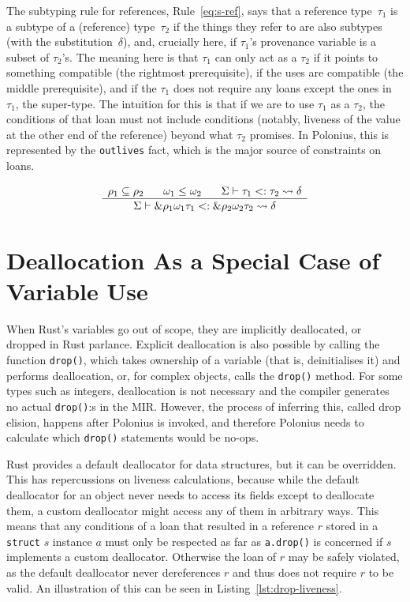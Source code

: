 \documentclass[11pt,a4paper,twoside,openany,draft]{report}
\newcommand{\InRust}[1]{\texttt{#1}}
\newcommand{\InDatalog}[1]{\texttt{#1}}
\newcommand{\ntyperule}[2]{\begin{array}{c}#1\\\hline\raisebox{1pt}{\strut}#2\end{array}}
\begin{document}
The subtyping rule for references, Rule~\eqref{eq:s-ref}, says that a reference
type~$\tau_1$ is a subtype of a (reference) type~$\tau_2$ if the things they
refer to are also subtypes (with the substitution~$\delta$), and, crucially
here, if $\tau_1$'s provenance variable is a subset of $\tau_2$'s. The meaning
here is that $\tau_1$ can only act as a $\tau_2$ if it points to something
compatible (the rightmost prerequisite), if the uses are compatible (the middle
prerequisite), and if the $\tau_1$ does not require any loans except the ones in
$\tau_1$, the super-type. The intuition for this is that if we are to use
$\tau_1$ as a $\tau_2$, the conditions of that loan must not include conditions
(notably, liveness of the value at the other end of the reference) beyond what
$\tau_2$ promises. In Polonius, this is represented by the \InDatalog{outlives}
fact, which is the major source of constraints on loans.

\begin{equation}\label{eq:s-ref}
  \ntyperule{
    \rho_1 \subseteq \rho_2 \:\:\:\:\:\:\:\:
    \omega_1 \leq \omega_2 \:\:\:\:\:\:\:\:
    \Sigma \vdash \tau_1 <: \tau_2 \leadsto \delta
  }
  {
    \Sigma \vdash \&\rho_1 \omega_1 \tau_1 <: \& \rho_2 \omega_2 \tau_2 \leadsto \delta
  }
\end{equation}

\section{Deallocation As a Special Case of Variable Use}
\label{sec:deall-as-spec}
When Rust's variables go out of scope, they are implicitly deallocated, or
dropped in Rust parlance. Explicit deallocation is also possible by calling the
function \InRust{drop()}, which takes ownership of a variable (that is,
deinitialises it) and performs deallocation, or, for complex objects, calls the
\InRust{drop()} method. For some types such as integers, deallocation is not
necessary and the compiler generates no actual \InRust{drop()}:s in the MIR.
However, the process of inferring this, called drop elision, happens after
Polonius is invoked, and therefore Polonius needs to calculate which
\InRust{drop()} statements would be no-ops.

Rust provides a default deallocator for data structures, but it can be
overridden. This has repercussions on liveness calculations, because while the
default deallocator for an object never needs to access its fields except to
deallocate them, a custom deallocator might access any of them in arbitrary
ways. This means that any conditions of a loan that resulted in a reference $r$
stored in a \InRust{struct} $s$ instance $a$ must only be respected as far as
\InRust{a.drop()} is concerned if $s$ implements a custom deallocator. Otherwise
the loan of $r$ may be safely violated, as the default deallocator never
dereferences $r$ and thus does not require $r$ to be valid. An illustration of
this can be seen in Listing~\ref{lst:drop-liveness}.
\end{document}
